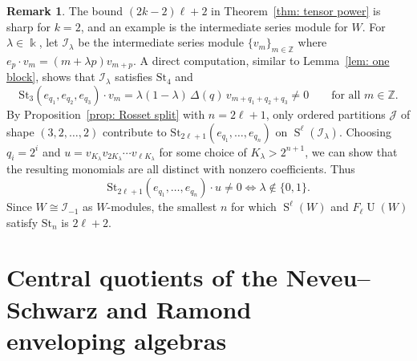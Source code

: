 \documentclass[12pt]{amsart}
\theoremstyle{plain}
\theoremstyle{definition}
\newtheorem{remark}[theorem]{Remark}
\numberwithin{equation}{theorem}
\newcommand{\kk}{\Bbbk}
\newcommand{\Sa}{\operatorname{S}}
\newcommand{\UU}{\operatorname{U}}
\newcommand{\ZZ}{\mathbb{Z}}
\newcommand{\mc}[1]{\mathcal{#1}}
\newcommand{\St}{\mathrm{St}}
\begin{document}
\begin{remark}\label{rem: bound is tight}
    The bound $(2k-2)\ell+2$ in Theorem~\ref{thm: tensor power} is sharp for $k=2$, and an example is the intermediate series module for $W$. For $\lambda \in \kk$, let $\mathcal{I}_\lambda$ be the intermediate series module $\{v_m\}_{m \in \ZZ}$ where $e_p \cdot v_m = (m + \lambda p) v_{m+p}$. A direct computation, similar to Lemma~\ref{lem: one block}, shows that $\mathcal{I}_\lambda$ satisfies $\St_4$ and 
    \[\St_3(e_{q_1}, e_{q_2}, e_{q_3}) \cdot v_m=\lambda(1-\lambda)\,\Delta(q)\,v_{m+q_1+q_2+q_3} \neq 0 \qquad \text{for all } m\in\ZZ.\]
    By Proposition~\ref{prop: Rosset split} with $n=2\ell+1$, only ordered partitions $\mc{J}$ of shape $(3, 2, \dots, 2)$ contribute to $\St_{2\ell+1}(e_{q_1}, \dots, e_{q_n})$ on $\Sa^\ell(\mathcal{I}_\lambda)$. Choosing $q_i=2^i$ and $u=v_{K_\lambda} v_{2K_\lambda} \cdots v_{\ell K_\lambda}$ for some choice of $K_\lambda > 2^{n+1}$, we can show that the resulting monomials are all distinct with nonzero coefficients. Thus 
    \[\St_{2\ell+1}(e_{q_1}, \dots, e_{q_n}) \cdot u \neq 0 \Leftrightarrow \lambda \notin\{0,1\}.\]
    Since $W \cong \mathcal{I}_{-1}$ as $W$-modules, the smallest $n$ for which $\Sa^\ell(W)$ and $F_\ell \UU(W)$ satisfy $\St_n$ is $2\ell+2$.
\end{remark}

\section{\texorpdfstring{Central quotients of the Neveu--Schwarz and Ramond \\ enveloping algebras}{Neveu--Schwarz and Ramon}}\label{sec: super}
\end{document}
